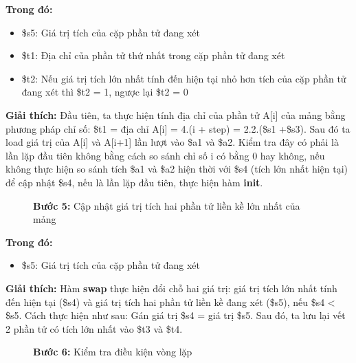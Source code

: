 \documentclass[a4paper,12pt]{article}
\begin{document}
\noindent
\textbf{Trong đó: }
\begin{itemize}
    \item \$s5:	Giá trị tích của cặp phần tử đang xét
    \item \$t1: Địa chỉ của phần tử thứ nhất trong cặp phần tử đang xét
    \item \$t2: Nếu giá trị tích lớn nhất tính đến hiện tại nhỏ hơn tích của cặp phần tử đang xét thì \$t2 = 1, ngược lại \$t2 = 0
\end{itemize}
\noindent
\textbf{Giải thích: }Đầu tiên, ta thực hiện tính địa chỉ của phần tử A[i] của mảng bằng phương pháp chỉ số: \$t1 = địa chỉ A[i] = 4.(i + step) = 2.2.(\$s1 +\$s3). Sau đó ta load giá trị của A[i] và A[i+1] lần lượt vào \$a1 và \$a2. Kiểm tra đây có phải là lần lặp đầu tiên không bằng cách so sánh chỉ số i có bằng 0 hay không, nếu không thực hiện so sánh tích \$a1 và \$a2 hiện thời với \$s4 (tích lớn nhất hiện tại) để cập nhật \$s4, nếu là lần lặp đầu tiên, thực hiện hàm \textbf{init}.
\clearpage
\begin{figure}[!h]
	\centerline{}
	\caption*{\textbf{Bước 5:} Cập nhật giá trị tích hai phần tử liền kề lớn nhất của mảng}
	\label{fig:data6}
\end{figure}
\noindent
\textbf{Trong đó: }
\begin{itemize}
    \item \$s5:	Giá trị tích của cặp phần tử đang xét
\end{itemize}
\noindent
\textbf{Giải thích: }Hàm \textbf{swap} thực hiện đổi chỗ hai giá trị: giá trị tích lớn nhất tính đến hiện tại (\$s4) và giá trị tích hai phần tử liền kề đang xét (\$s5), nếu \$s4 < \$s5. Cách thực hiện như sau: Gán giá trị \$s4 = giá trị \$s5. Sau đó, ta lưu lại vết 2 phần tử có tích lớn nhất vào \$t3 và \$t4.
\begin{figure}[!h]
	\centerline{}
	\caption*{\textbf{Bước 6:} Kiểm tra điều kiện vòng lặp}
	\label{fig:data6}
\end{figure}
\end{document}
